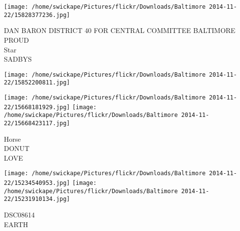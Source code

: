 \documentclass[10pt,letterpaper]{article}
\begin{document}
\texttt{[image: /home/swickape/Pictures/flickr/Downloads/Baltimore 2014-11-22/15828377236.jpg]}

DAN BARON DISTRICT 40 FOR CENTRAL COMMITTEE BALTIMORE PROUD\\
Star\\
SADBYS\\
\pagebreak

\texttt{[image: /home/swickape/Pictures/flickr/Downloads/Baltimore 2014-11-22/15852200811.jpg]}

\vspace{0.25in}
\texttt{[image: /home/swickape/Pictures/flickr/Downloads/Baltimore 2014-11-22/15668181929.jpg]}
\texttt{[image: /home/swickape/Pictures/flickr/Downloads/Baltimore 2014-11-22/15668423117.jpg]}

Horse\\
DONUT\\
LOVE\\
\pagebreak

\texttt{[image: /home/swickape/Pictures/flickr/Downloads/Baltimore 2014-11-22/15234540953.jpg]}
\texttt{[image: /home/swickape/Pictures/flickr/Downloads/Baltimore 2014-11-22/15231910134.jpg]}

DSC08614\\
EARTH\\
\pagebreak
\end{document}
